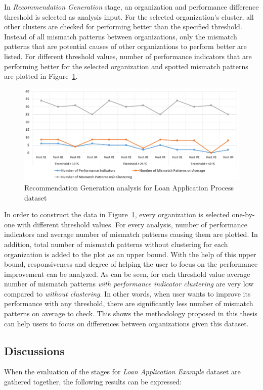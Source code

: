 In \textit{Recommendation Generation} stage, an organization and performance difference threshold is selected as analysis input. For the selected organization's cluster, all other clusters are checked for performing better than the specified threshold. Instead of all mismatch patterns between organizations, only the mismatch patterns that are potential causes of other organizations to perform better are listed. For different threshold values, number of performance indicators that are performing better for the selected organization and spotted mismatch patterns are plotted in Figure~\ref{fig:loan-recommendation-generation-analysis}. 
\begin{figure}
	\centering
	\includegraphics[width=\textwidth]{5_results_discussions/loan-application-process/recommendation-generation-analysis}
	\caption{Recommendation Generation analysis for Loan Application Process dataset}
  \label{fig:loan-recommendation-generation-analysis}
\end{figure}

In order to construct the data in Figure~\ref{fig:loan-recommendation-generation-analysis}, every organization is selected one-by-one with different threshold values. For every analysis, number of performance indicators and average number of mismatch patterns causing them are plotted. In addition, total number of mismatch patterns without clustering for each organization is added to the plot as an upper bound. With the help of this upper bound, responsiveness and degree of helping the user to focus on the performance improvement can be analyzed. As can be seen, for each threshold value average number of mismatch patterns \textit{with performance indicator clustering} are very low compared to \textit{without clustering}. In other words, when user wants to improve its performance with any threshold, there are significantly less number of mismatch patterns on average to check. This shows the methodology proposed in this thesis can help users to focus on differences between organizations given this dataset. 

\subsection{Discussions}
\label{sec:loan-app-discussions}
When the evaluation of the stages for \textit{Loan Application Example} dataset are gathered together, the following results can be expressed:

